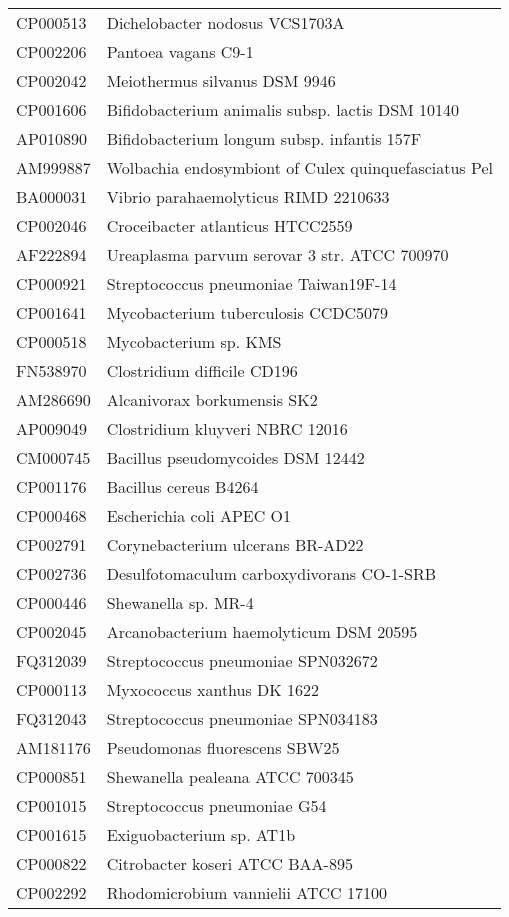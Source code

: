\begin{longtable}{ll}
CP000513 & Dichelobacter nodosus VCS1703A\\
CP002206 & Pantoea vagans C9-1\\
CP002042 & Meiothermus silvanus DSM 9946\\
CP001606 & Bifidobacterium animalis subsp. lactis DSM 10140\\
AP010890 & Bifidobacterium longum subsp. infantis 157F\\
AM999887 & Wolbachia endosymbiont of Culex quinquefasciatus Pel\\
BA000031 & Vibrio parahaemolyticus RIMD 2210633\\
CP002046 & Croceibacter atlanticus HTCC2559\\
AF222894 & Ureaplasma parvum serovar 3 str. ATCC 700970\\
CP000921 & Streptococcus pneumoniae Taiwan19F-14\\
CP001641 & Mycobacterium tuberculosis CCDC5079\\
CP000518 & Mycobacterium sp. KMS\\
FN538970 & Clostridium difficile CD196\\
AM286690 & Alcanivorax borkumensis SK2\\
AP009049 & Clostridium kluyveri NBRC 12016\\
CM000745 & Bacillus pseudomycoides DSM 12442\\
CP001176 & Bacillus cereus B4264\\
CP000468 & Escherichia coli APEC O1\\
CP002791 & Corynebacterium ulcerans BR-AD22\\
CP002736 & Desulfotomaculum carboxydivorans CO-1-SRB\\
CP000446 & Shewanella sp. MR-4\\
CP002045 & Arcanobacterium haemolyticum DSM 20595\\
FQ312039 & Streptococcus pneumoniae SPN032672\\
CP000113 & Myxococcus xanthus DK 1622\\
FQ312043 & Streptococcus pneumoniae SPN034183\\
AM181176 & Pseudomonas fluorescens SBW25\\
CP000851 & Shewanella pealeana ATCC 700345\\
CP001015 & Streptococcus pneumoniae G54\\
CP001615 & Exiguobacterium sp. AT1b\\
CP000822 & Citrobacter koseri ATCC BAA-895\\
CP002292 & Rhodomicrobium vannielii ATCC 17100\\

\end{longtable}
